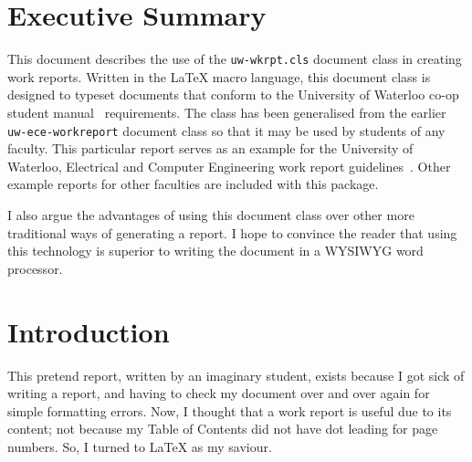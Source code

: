 \documentclass{uw-wkrpt}
\begin{document}
\setlength{\parskip}{1ex}
\setlength{\parindent}{0.4in}

\onehalfspacing
\section*{Executive Summary}
{}

\setcounter{page}{3}

This document describes the use of the \texttt{uw-wkrpt.cls}
document class in creating work reports.  Written in the 
\LaTeX{} macro language, this document class is designed to typeset 
documents that conform to the University of Waterloo co-op student 
manual~\cite{ref:coopman} requirements.  The class has been generalised
from the earlier \texttt{uw-ece-workreport} document class so that it
may be used by students of any faculty.  This particular report 
serves as an example for the University of Waterloo, Electrical and 
Computer Engineering work report guidelines~\cite{ref:eceguidelines}.  
Other example reports for other faculties are included with this package.

I also argue the advantages of using this document class over other
more traditional ways of generating a report.  I hope to convince the
reader that using this technology is superior to writing the document
in a WYSIWYG word processor.

\clearpage
{}
\tableofcontents
\clearpage
{}
\listoffigures
\clearpage
{}
\listoftables

\clearpage
{}
\onehalfspacing

\section{Introduction}\label{sec:intro}
This pretend report, written by an imaginary student,
exists because I got sick of writing a report,
and having to check my document over and over again for simple
formatting errors.  Now, I thought that a work report is useful
due to its content; not because my Table of Contents did not have dot
leading for page numbers.  So, I turned to \LaTeX{} as my saviour.
\end{document}
